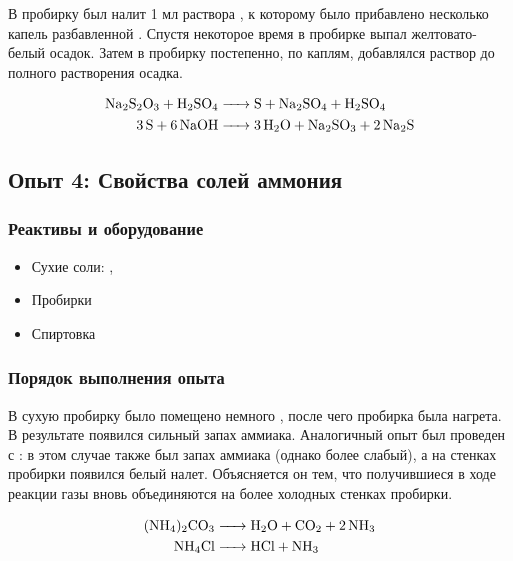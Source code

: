 \documentclass[a4paper, 12pt]{article}
\begin{document}
В пробирку был налит 1 мл раствора , к которому было прибавлено несколько капель разбавленной . Спустя некоторое время в пробирке выпал желтовато-белый осадок. Затем в пробирку постепенно, по каплям, добавлялся раствор  до полного растворения осадка. %

\begin{align}
	\ce{Na2S2O3 + H2SO4 &-> S + Na2SO4 + H2SO4}\\
	\ce{3S + 6NaOH &-> 3 H2O + Na2SO3 + 2 Na2S}
\end{align}

\subsection{Опыт 4: Свойства солей аммония}

\subsubsection{Реактивы и оборудование}

\begin{itemize}
	\item Сухие соли: , 
	
	\item Пробирки
	
	\item Спиртовка
\end{itemize}

\subsubsection{Порядок выполнения опыта}

В сухую пробирку было помещено немного , после чего пробирка была нагрета. В результате появился сильный запах аммиака. Аналогичный опыт был проведен с : в этом случае также был запах аммиака (однако более слабый), а на стенках пробирки появился белый налет. Объясняется он тем, что получившиеся в ходе реакции газы вновь объединяются на более холодных стенках пробирки.

\begin{align}
	\ce{(NH4)2CO3 &-> H2O + CO2 + 2 NH3}\\
	\ce{NH4Cl &-> HCl + NH3}
\end{align}

\end{document}
